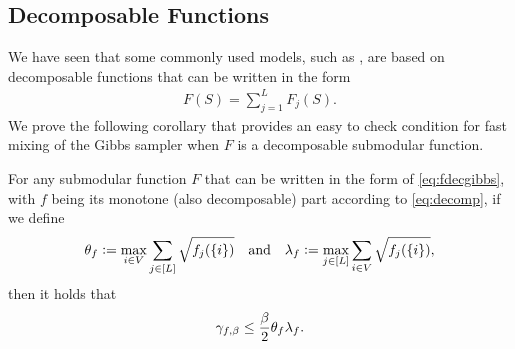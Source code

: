 \subsection{Decomposable Functions}
We have seen that some commonly used models, such as \flid{}, are based on decomposable functions that can be written in the form
\begin{align}\label{eq:fdecgibbs}
F(S) = \sum_{j=1}^L F_{j}(S).
\end{align}
We prove the following corollary that provides an easy to check condition for fast mixing of the Gibbs sampler when $F$ is a decomposable submodular function.
\begin{cor} \label{cor:fast}
  For any submodular function $F$ that can be written in the form of \eqref{eq:fdecgibbs}, with $f$ being its monotone (also decomposable) part according to \eqref{eq:decomp}, if we define
  \begin{align*}
  	\theta_f \vcentcolon= \max_{i \in V} \sum_{j\in [L]} \sqrt{f_{j}(\{i\})} \hspace{1em}\textrm{and}\hspace{1em} \lambda_f \vcentcolon= \max_{j\in [L]} \sum_{i \in V} \sqrt{f_{j}(\{i\})},
  \end{align*}
  then it holds that
  \begin{align*}
  	\gamma_{f,\beta} \leq \frac{\beta}{2} \theta_f \lambda_f.
  \end{align*}
\end{cor}

